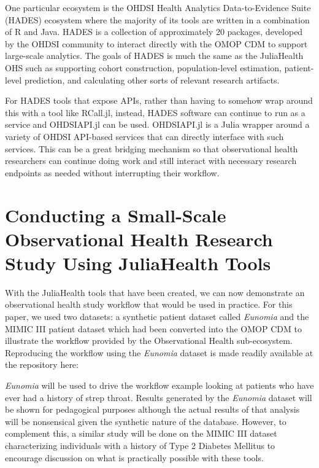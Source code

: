 \documentclass{juliacon}
\begin{document}
One particular ecosystem is the OHDSI Health Analytics Data-to-Evidence Suite (HADES) ecosystem where the majority of its tools are written in a combination of R and Java.
HADES is a collection of approximately 20 packages, developed by the OHDSI community to interact directly with the OMOP CDM to support large-scale analytics.
The goals of HADES is much the same as the JuliaHealth OHS such as supporting cohort construction, population-level estimation, patient-level prediction, and calculating other sorts of relevant research artifacts.

For HADES tools that expose APIs, rather than having to somehow wrap around this with a tool like RCall.jl, instead, HADES software can continue to run as a service and OHDSIAPI.jl can be used.
OHDSIAPI.jl is a Julia wrapper around a variety of OHDSI API-based services that can directly interface with such services.
This can be a great bridging mechanism so that observational health researchers can continue doing work and still interact with necessary research endpoints as needed without interrupting their workflow.

\section{Conducting a Small-Scale Observational Health Research Study Using JuliaHealth Tools}

With the JuliaHealth tools that have been created, we can now demonstrate an observational health study workflow that would be used in practice.
For this paper, we used two datasets: a synthetic patient dataset called \textit{Eunomia} and the MIMIC III patient dataset which had been converted into the OMOP CDM to illustrate the workflow provided by the Observational Health sub-ecosystem.
Reproducing the workflow using the \textit{Eunomia} dataset is made readily available at the repository here: \cite{schuemieEunomia2023}


\textit{Eunomia} will be used to drive the workflow example looking at patients who have ever had a history of strep throat.
Results generated by the \textit{Eunomia} dataset will be shown for pedagogical purposes although the actual results of that analysis will be nonsensical given the synthetic nature of the database.
However, to complement this, a similar study will be done on the MIMIC III dataset characterizing individuals with a history of Type 2 Diabetes Mellitus to encourage discussion on what is practically possible with these tools.
\end{document}
